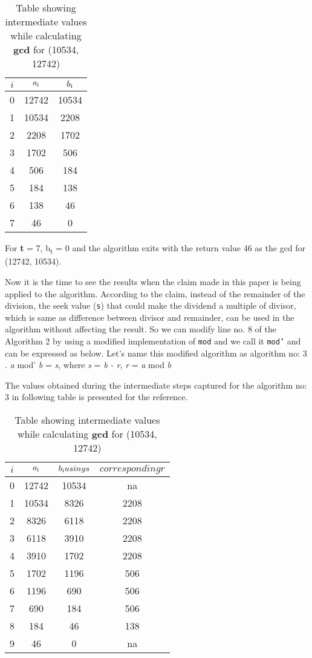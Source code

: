 \documentclass[12pt]{article}
\begin{document}
\begin{table}[h!]
\centering
	\begin{tabular}{c | c | c}
		\hline
		$i$ & $a\textsubscript{i}$ & $b\textsubscript{i}$ \\ [0.5ex] 
		\hline
		0 & 12742 & 10534 \\ 
		1 & 10534 & 2208 \\  
		2 & 2208  & 1702 \\
		3 & 1702  & 506 \\
		4 & 506   & 184 \\
		5 & 184   & 138 \\
		6 & 138   & 46 \\
		7 & 46    & 0
	\end{tabular}
\caption{Table showing intermediate values while calculating \textbf{gcd} for (10534, 12742)}
\label{table:2}
\end{table}

For \textbf{t} = 7, b\textsubscript{t} = 0 and the algorithm exits with the return value 
46 as the gcd for (12742, 10534).

Now it is the time to see the results when the claim made in this paper is being applied 
to the algorithm. According to the claim, instead of the remainder of the division, the seek value (\texttt{s}) that could make the dividend a multiple of divisor, which is same as difference between divisor and remainder, can be used in the algorithm without affecting the result. So we can modify line no. 8 of the Algorithm 2 by using a modified implementation of \texttt{mod} and we call it \texttt{mod'} and can be expressed as below. Let's name this modified algorithm as algorithm no: 3 .  \linebreak
\textit{a} mod' \textit{b} = \textit{s}, where  \textit{s} = \textit{b - r}, \textit{r} = \textit{a} mod \textit{b}

The values obtained during the intermediate steps captured for the algorithm no: 3 in following table is presented for the reference.

\begin{table}[h!]
\centering
	\begin{tabular}{c | c | c | c}
		\hline
		$i$ & $a\textsubscript{i}$ & $b\textsubscript{i} using s$ & $corresponding r$\\ [0.5ex] 
		\hline
		0 & 12742 & 10534 & na  \\ 
		1 & 10534 & 8326  & 2208\\  
		2 & 8326  & 6118  & 2208\\
		3 & 6118  & 3910  & 2208\\
		4 & 3910   & 1702 & 2208\\
		5 & 1702   & 1196 & 506\\
		6 & 1196   & 690  & 506\\
		7 & 690    & 184  & 506\\
		8 & 184    & 46   & 138\\
		9 & 46     & 0    & na
	\end{tabular}
\caption{Table showing intermediate values while calculating \textbf{gcd} for (10534, 12742)}
\label{table:3}
\end{table}
\end{document}
